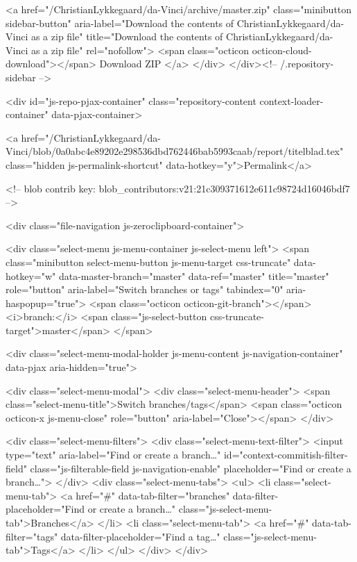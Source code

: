                 <a href="/ChristianLykkegaard/da-Vinci/archive/master.zip"
                   class="minibutton sidebar-button"
                   aria-label="Download the contents of ChristianLykkegaard/da-Vinci as a zip file"
                   title="Download the contents of ChristianLykkegaard/da-Vinci as a zip file"
                   rel="nofollow">
                  <span class="octicon octicon-cloud-download"></span>
                  Download ZIP
                </a>
              </div>
        </div><!-- /.repository-sidebar -->

        <div id="js-repo-pjax-container" class="repository-content context-loader-container" data-pjax-container>
          

<a href="/ChristianLykkegaard/da-Vinci/blob/0a0abc4e89202e298536dbd762446bab5993caab/report/titelblad.tex" class="hidden js-permalink-shortcut" data-hotkey="y">Permalink</a>

<!-- blob contrib key: blob_contributors:v21:21c309371612e611c98724d16046bdf7 -->

<div class="file-navigation js-zeroclipboard-container">
  
<div class="select-menu js-menu-container js-select-menu left">
  <span class="minibutton select-menu-button js-menu-target css-truncate" data-hotkey="w"
    data-master-branch="master"
    data-ref="master"
    title="master"
    role="button" aria-label="Switch branches or tags" tabindex="0" aria-haspopup="true">
    <span class="octicon octicon-git-branch"></span>
    <i>branch:</i>
    <span class="js-select-button css-truncate-target">master</span>
  </span>

  <div class="select-menu-modal-holder js-menu-content js-navigation-container" data-pjax aria-hidden="true">

    <div class="select-menu-modal">
      <div class="select-menu-header">
        <span class="select-menu-title">Switch branches/tags</span>
        <span class="octicon octicon-x js-menu-close" role="button" aria-label="Close"></span>
      </div>

      <div class="select-menu-filters">
        <div class="select-menu-text-filter">
          <input type="text" aria-label="Find or create a branch…" id="context-commitish-filter-field" class="js-filterable-field js-navigation-enable" placeholder="Find or create a branch…">
        </div>
        <div class="select-menu-tabs">
          <ul>
            <li class="select-menu-tab">
              <a href="#" data-tab-filter="branches" data-filter-placeholder="Find or create a branch…" class="js-select-menu-tab">Branches</a>
            </li>
            <li class="select-menu-tab">
              <a href="#" data-tab-filter="tags" data-filter-placeholder="Find a tag…" class="js-select-menu-tab">Tags</a>
            </li>
          </ul>
        </div>
      </div>

